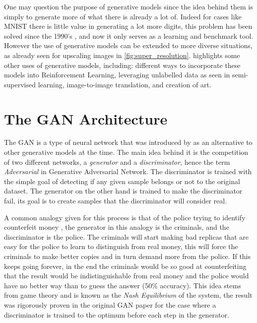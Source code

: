 One may question the purpose of generative models since the idea behind them is simply to generate more of what there is already a lot of. Indeed for cases like \gls{MNIST} there is little value in generating a lot more digits, this problem has been solved since the 1990's \cite{mnist1998}, and now it only serves as a learning and benchmark tool. However the use of generative models can be extended to more diverse situations, as already seen for upscaling images in \autoref{fig:super_resolution}. \textcite{nipsGAN2017} highlights some other uses of generative models, including: different ways to incorporate these models into Reinforcement Learning, leveraging unlabelled data as seen in semi-supervised learning, image-to-image translation, and creation of art.


\section{The GAN Architecture} \label{sec:gan_architecture}
The \gls{GAN} is a type of neural network that was introduced by \textcite{gans2014} as an alternative to other generative models at the time. The main idea behind it is the competition of two different networks, a \textit{generator} and a \textit{discriminator}, hence the term \textit{Adversarial} in Generative Adversarial Network. The discriminator is trained with the simple goal of detecting if any given sample belongs or not to the original dataset. The generator on the other hand is trained to make the discriminator fail, its goal is to create samples that the discriminator will consider real.

A common analogy given for this process is that of the police trying to identify counterfeit money \cite{nipsGAN2017}, the generator in this analogy is the criminals, and the discriminator is the police. The criminals will start making bad replicas that are easy for the police to learn to distinguish from real money, this will force the criminals to make better copies and in turn demand more from the police. If this keeps going forever, in the end the criminals would be so good at counterfeiting that the result would be indistinguishable from real money and the police would have no better way than to guess the answer (50\% accuracy). This idea stems from game theory and is known as the \textit{Nash Equilibrium} of the system, the result was rigorously proven in the original \gls{GAN} paper \cite{gans2014} for the case where a discriminator is trained to the optimum before each step in the generator.

